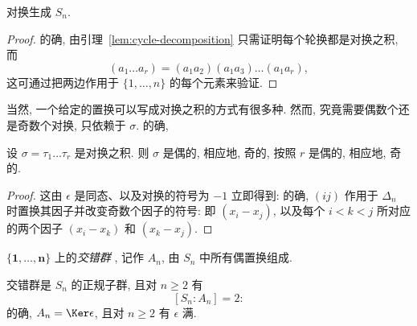\begin{lemma}
\label{lem:transpositions-generate}
对换生成 $S_n$.
\end{lemma}

\begin{proof}
的确, 由引理~\ref{lem:cycle-decomposition} 只需证明每个轮换都是对换之积, 而
\[
(a_1 \dots a_r) = (a_1 a_2)(a_1 a_3)\dots(a_1 a_r),
\]
这可通过把两边作用于 $\{1,\dots,n\}$ 的每个元素来验证.
\end{proof}

当然, 一个给定的置换可以写成对换之积的方式有很多种. 然而, 究竟需要偶数个还是奇数个对换, 只依赖于 $\sigma$. 的确,

\begin{lemma}
\label{lem:transposition-parity}
设 $\sigma = \tau_1 \dots \tau_r$ 是对换之积. 则 $\sigma$ 是偶的, 相应地, 奇的, 按照 $r$ 是偶的, 相应地, 奇的.
\end{lemma}

\begin{proof}
这由 $\epsilon$ 是同态、以及对换的符号为 $-1$ 立即得到: 的确, $(ij)$ 作用于 $\Delta_n$ 时置换其因子并改变奇数个因子的符号: 即 $(x_i-x_j)$, 以及每个 $i<k<j$ 所对应的两个因子 $(x_i-x_k)$ 和 $(x_k-x_j)$.
\end{proof}

\begin{definition}
\label{def:alternating}
$\{\mathbf{1},\dots,\mathbf{n}\}$ 上的\emph{交错群}%
, 记作 $A_n$, 由 $S_n$ 中所有偶置换组成.
\end{definition}

交错群是 $S_n$ 的正规子群, 且对 $n \geq 2$ 有
\[
[S_n : A_n] = 2:
\]
的确, $A_n = \Ker \epsilon$, 且对 $n \geq 2$ 有 $\epsilon$ 满.

